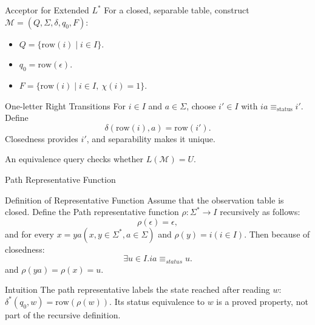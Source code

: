 \documentclass{beamer}
\begin{document}
\begin{frame}{Acceptor for Extended $L^*$}
    For a closed, separable table, construct
    $\mathcal{M}=(Q,\Sigma,\delta,q_0,F)$:
    \begin{itemize}
        \item $Q=\{\text{row}(i)\mid i\in I\}$.
        \item $q_0=\text{row}(\epsilon)$.
        \item $F=\{\text{row}(i)\mid i\in I,\ \chi(i)=1\}$.
    \end{itemize}
    \begin{block}{One-letter Right Transitions}
        For $i\in I$ and $a\in\Sigma$, choose $i'\in I$ with
        $ia\equiv_{\mathrm{status}}i'$. Define
        $$
        \delta(\text{row}(i),a)=\text{row}(i').
        $$
        Closedness provides $i'$, and separability makes it unique.
    \end{block}
    An equivalence query checks whether $L(\mathcal{M})=U$.
\end{frame}

\begin{frame}{Path Representative Function}
    \begin{block}{Definition of Representative Function}
        Assume that the observation table is closed.
        Define the Path representative function $\rho:\Sigma^*\to I$ recursively as follows:
        \[
        \rho(\epsilon)=\epsilon,
        \]
        and for every $x = ya(x,y\in\Sigma^*, a\in\Sigma)$ and $\rho(y) = i (i\in I)$. Then because of closedness:
        \[
        \exists u \in I. ia \equiv_{status} u.
        \]
        and $\rho(ya) = \rho(x) = u$. 
    \end{block}

    \begin{alertblock}{Intuition}
        The path representative labels the state reached after reading $w$:
        $
        \delta^*(q_0,w)=\text{row}(\rho(w)).
        $
        Its status equivalence to $w$ is a proved property, not part of
        the recursive definition.
    \end{alertblock}
\end{frame}

\end{document}
